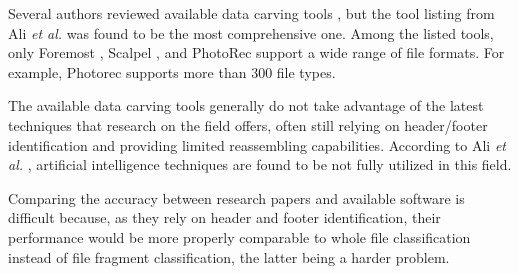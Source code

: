Several authors reviewed  available data carving tools
\cite{ali_review_2018}
\cite{qiu_new_2014}
\cite{nadeem_ashraf_forensic_2013}
\cite{roux_reconstructing_2008}, 
but the tool listing from Ali \textit{et al.} \cite{ali_review_2018} was found to be the most comprehensive one. Among the listed tools, only Foremost \cite{kendall_foremost_2019}, Scalpel \cite{richard_iii_scalpel:_2005}, and PhotoRec \cite{grenier_photorec_2019} support a wide range of file formats. For example, Photorec supports more than 300 file types.

The available data carving tools generally do not take advantage of the latest techniques that research on the field offers, often still relying on header/footer identification and providing limited reassembling capabilities.
According to Ali \textit{et al.} \cite{ali_review_2018}, artificial intelligence techniques are found to be not fully utilized in this field.

Comparing the accuracy between research papers and available software is difficult because, as they rely on header and footer identification, their performance would be more properly comparable to whole file classification instead of file fragment classification, the latter being a harder problem.
